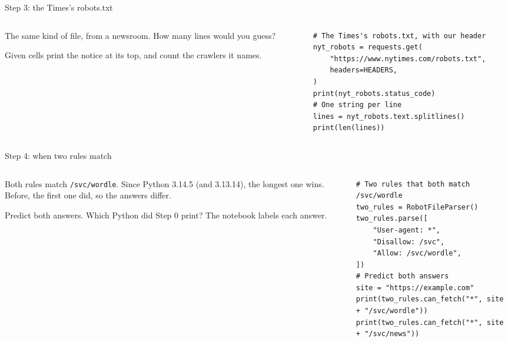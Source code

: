 \documentclass[9pt,aspectratio=169]{beamer}
\begin{document}
\begin{frame}[fragile]{Step 3: the Times's robots.txt}
    \begin{columns}[T]
        \begin{column}{0.37\textwidth}
            The same kind of file, from a newsroom. How many lines would you guess?

            \medskip
            Given cells print the notice at its top, and count the crawlers it names.
        \end{column}
        \begin{column}{0.6\textwidth}
\begin{lstlisting}[basicstyle=\ttfamily\footnotesize]
# The Times's robots.txt, with our header
nyt_robots = requests.get(
    "https://www.nytimes.com/robots.txt",
    headers=HEADERS,
)
print(nyt_robots.status_code)
# One string per line
lines = nyt_robots.text.splitlines()
print(len(lines))
\end{lstlisting}
        \end{column}
    \end{columns}
\end{frame}

\begin{frame}[fragile]{Step 4: when two rules match}
    \begin{columns}[T]
        \begin{column}{0.37\textwidth}
            Both rules match \texttt{/svc/wordle}. Since Python 3.14.5 (and 3.13.14), the longest one wins. Before, the first one did, so the answers differ.

            \medskip
            Predict both answers. Which Python did Step 0 print? The notebook labels each answer.
        \end{column}
        \begin{column}{0.6\textwidth}
\begin{lstlisting}[basicstyle=\ttfamily\footnotesize]
# Two rules that both match /svc/wordle
two_rules = RobotFileParser()
two_rules.parse([
    "User-agent: *",
    "Disallow: /svc",
    "Allow: /svc/wordle",
])
# Predict both answers
site = "https://example.com"
print(two_rules.can_fetch("*", site + "/svc/wordle"))
print(two_rules.can_fetch("*", site + "/svc/news"))
\end{lstlisting}
        \end{column}
    \end{columns}
\end{frame}
\end{document}
